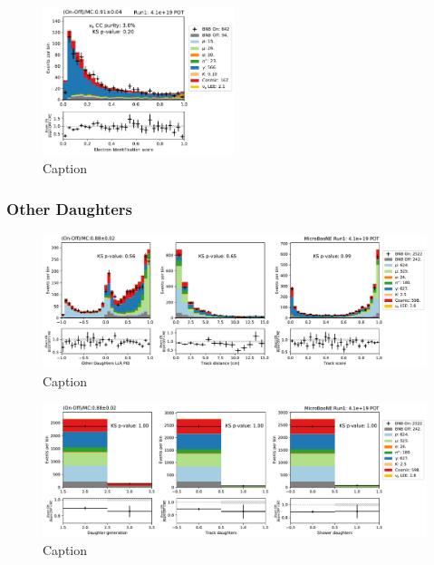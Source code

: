 \begin{figure}
    \centering
    \includegraphics[width=0.5\textwidth]{NueCCsel/Images/run1/pre_e_score.pdf}
    \caption{Caption}
    \label{fig:pre_shower_E_pdg}
\end{figure}


\subsubsection{Other Daughters}

\begin{figure}
    \centering
    \includegraphics[width=\textwidth]{NueCCsel/Images/run1/pre_daughter_1.pdf}
    \caption{Caption}
    \label{fig:pre_daughter_1}
\end{figure}

\begin{figure}
    \centering
    \includegraphics[width=\textwidth]{NueCCsel/Images/run1/pre_daughter_2.pdf}
    \caption{Caption}
    \label{fig:pre_daughter_2}
\end{figure}

